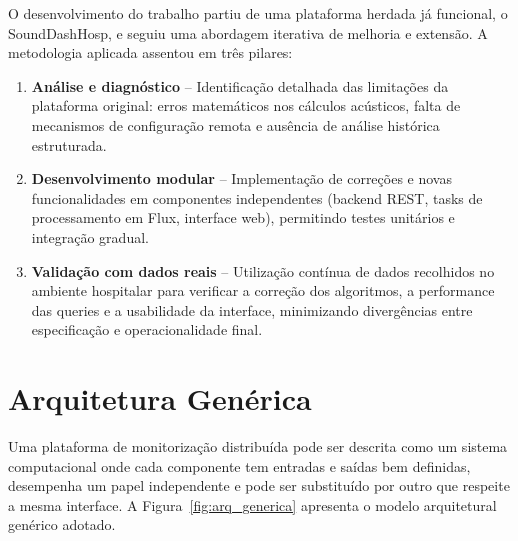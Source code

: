 \documentclass[12pt,a4paper]{report}
\begin{document}
O desenvolvimento do trabalho partiu de uma plataforma herdada já funcional, o SoundDashHosp, e seguiu uma abordagem iterativa de melhoria e extensão. A metodologia aplicada assentou em três pilares:

\begin{enumerate}[nosep]
  \item \textbf{Análise e diagnóstico} -- Identificação detalhada das limitações da plataforma original: erros matemáticos nos cálculos acústicos, falta de mecanismos de configuração remota e ausência de análise histórica estruturada.

  \item \textbf{Desenvolvimento modular} -- Implementação de correções e novas funcionalidades em componentes independentes (backend REST, tasks de processamento em Flux, interface web), permitindo testes unitários e integração gradual.

  \item \textbf{Validação com dados reais} -- Utilização contínua de dados recolhidos no ambiente hospitalar para verificar a correção dos algoritmos, a performance das queries e a usabilidade da interface, minimizando divergências entre especificação e operacionalidade final.
\end{enumerate}

\section{Arquitetura Genérica}
\label{sec:arq_generica}

Uma plataforma de monitorização distribuída pode ser descrita como um sistema computacional onde cada componente tem entradas e saídas bem definidas, desempenha um papel independente e pode ser substituído por outro que respeite a mesma interface. A Figura~\ref{fig:arq_generica} apresenta o modelo arquitetural genérico adotado.
\end{document}

